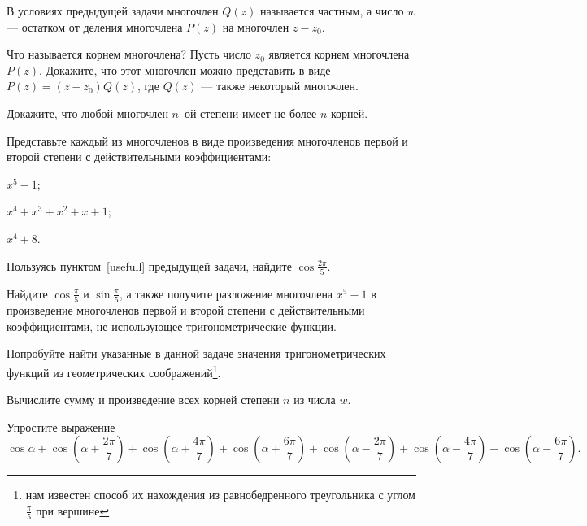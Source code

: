 \documentclass[a4paper, 12pt, num=22, date=16.09.2019]{listok}
\begin{document}
\begin{definition}
	В условиях предыдущей задачи многочлен $Q(z)$ называется частным,
	а число $w$ --- остатком от деления многочлена $P(z)$ на многочлен $z - z_0$.
\end{definition}
\begin{problem}
	Что называется корнем многочлена?
	Пусть число $z_0$ является корнем многочлена $P(z)$.
	Докажите, что этот многочлен можно представить в виде $P(z) = (z - z_0)Q(z)$,
	где $Q(z)$ --- также некоторый многочлен.
\end{problem}
\begin{problem}
	Докажите, что любой многочлен $n$--ой степени имеет не более $n$ корней.
\end{problem}
\begin{problem}
	Представьте каждый из многочленов в виде произведения многочленов первой и второй степени с действительными коэффициентами:
	\begin{multienum}{3}
		\item\label{usefull} $x^5 - 1$;
		\item $x^4 + x^3 + x^2 + x + 1$;
		\item $x^4 + 8$.
	\end{multienum}
\end{problem}
\begin{problem}
\begin{probparts}
	\item Пользуясь пунктом~\ref{usefull} предыдущей задачи, найдите $\cos{\frac{2\pi}5}$.
	\item Найдите $\cos{\frac \pi 5}$ и $\sin{\frac \pi 5}$,
	а также получите разложение многочлена $x^5 - 1$ в произведение многочленов первой и
	второй степени с действительными коэффициентами, не использующее тригонометрические функции.
	\item Попробуйте найти указанные в данной задаче значения тригонометрических функций
	из геометрических соображений\footnote{нам известен способ их нахождения из равнобедренного треугольника с углом $\frac \pi 5$ при вершине}.
\end{probparts}
\end{problem}
\begin{problem}
\begin{probenum}
	\item Вычислите сумму и произведение всех корней степени $n$ из числа $w$.
	\item Упростите выражение
	\[
		\cos \alpha
		+ \cos{(\alpha + \frac{2\pi}7)} + \cos{(\alpha + \frac{4\pi}7)} + \cos{(\alpha + \frac{6\pi}7)}
		+ \cos{(\alpha - \frac{2\pi}7)} + \cos{(\alpha - \frac{4\pi}7)} + \cos{(\alpha - \frac{6\pi}7)}.
	\]
\end{probenum}
\end{problem}
\end{document}

